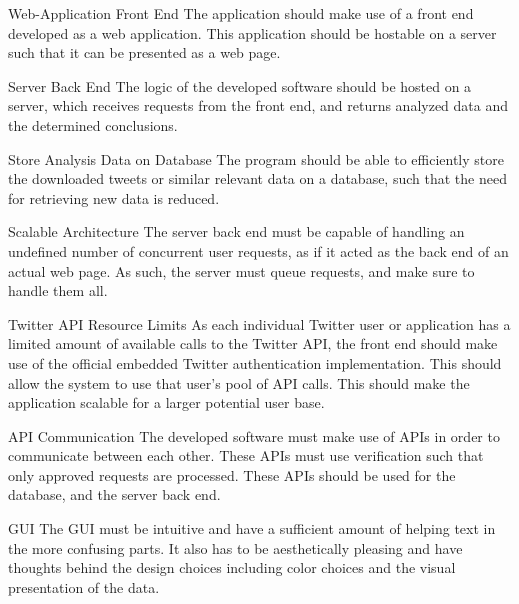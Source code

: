 \begin{requirement}{Web-Application Front End}
The application should make use of a front end developed as a web application.
This application should be hostable on a server such that it can be presented as
a web page.
\end{requirement}

\begin{requirement}{Server Back End}
The logic of the developed software should be hosted on a server, which receives
requests from the front end, and returns analyzed data and the determined
conclusions.
\end{requirement}

\begin{requirement}{Store Analysis Data on Database}
The program should be able to efficiently store the downloaded tweets or
similar relevant data on a database, such that the need for retrieving new data
is reduced.
\end{requirement}

\begin{requirement}{Scalable Architecture}
The server back end must be capable of handling an undefined number of
concurrent user requests, as if it acted as the back end of an actual web page. As such,
the server must queue requests, and make sure to handle them all.
\end{requirement}

\begin{requirement}{Twitter API Resource Limits}
As each individual Twitter user or application has a limited amount of available
calls to the Twitter API, the front end should make use of the official
embedded Twitter authentication implementation. This should allow the system to
use that user's pool of API calls. This should make the application scalable for
a larger potential user base.
\end{requirement}

\begin{requirement}{\ac{API} Communication}
The developed software must make use of \ac{API}s in order to communicate between
each other. These \ac{API}s must use verification such that only approved
requests are processed. These \ac{API}s should be used for the database, and the server back
end.
\end{requirement}

\begin{requirement}{GUI}
The GUI must be intuitive and have a sufficient amount of helping
text in the more confusing parts. It also has to be aesthetically pleasing and
have thoughts behind the design choices including color choices and the visual
presentation of the data.
\end{requirement}

